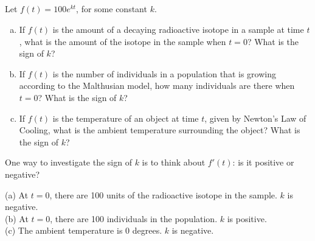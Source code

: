 \subsection*{\Application}



\begin{Mquestion}
Let $f(t)=100e^{kt}$, for some constant $k$.
\begin{enumerate}[(a)]
\item If $f(t)$ is the amount of a decaying radioactive isotope in a sample at time $t$,
what is the amount of the isotope in the sample when $t=0$? What is the sign of $k$?
\item If $f(t)$ is the number of individuals in a population that is growing according to the Malthusian model, how many individuals are there when $t=0$? What is the sign of $k$?
\item If $f(t)$ is the temperature of an object at time $t$, given by Newton's Law of Cooling, what is the ambient temperature surrounding the object? What is the sign of $k$?
\end{enumerate}
\end{Mquestion}
\begin{hint}
One way to investigate the sign of $k$ is to think about $f'(t)$: is it positive or negative?
\end{hint}
\begin{answer}
(a) At $t=0$, there are 100 units of the radioactive isotope in the sample. $k$ is negative.\\
(b) At $t=0$, there are 100 individuals in the population. $k$ is positive.\\
(c) The ambient temperature is 0 degrees. $k$ is negative.
\end{answer}
